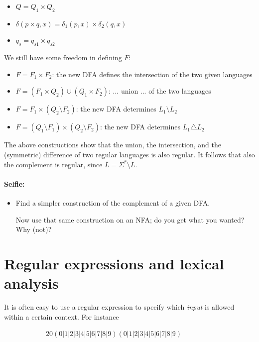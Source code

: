 \begin{itemize}
\item $Q = Q_1 \times Q_2$
\item $\delta(p \times q,x) = \delta_1(p,x) \times \delta_2(q,x)$
\item $q_s = q_{s1} \times q_{s2}$
\end{itemize}

We still have some freedom in defining $F$:

\begin{itemize}
\item $F = F_1 \times F_2$: the new DFA defines the intersection of
  the two given languages
\item $F = (F_1 \times Q_2) \cup (Q_1 \times F_2)$: ... union ...
of the two languages
\item $F = F_1 \times (Q_2 \setminus F_2)$: the new DFA determines
 $L_1 \setminus L_2$
\item $F = (Q_1 \setminus F_1) \times (Q_2 \setminus F_2)$: the new
  DFA determines $L_1 \triangle L_2$
\end{itemize}

The above constructions show that the union, the intersection, and the
(symmetric) difference of two regular languages is also regular. It
follows that also the complement is regular, since
%
$\overline{L} = \Sigma^* \setminus L$.

\paragraph{Selfie:}
\begin{itemize}
\item[]
Find a simpler construction of the complement of a given DFA.

Now use that same construction on an NFA; do you get what you wanted?
Why (not)?
\end{itemize}






\clearpage
\section{Regular expressions and lexical analysis}

It is often easy to use a regular expression to specify which {\em
  input} is allowed within a certain context. For instance


~~~~~~~~~~~~$20(0|1|2|3|4|5|6|7|8|9)(0|1|2|3|4|5|6|7|8|9)$

